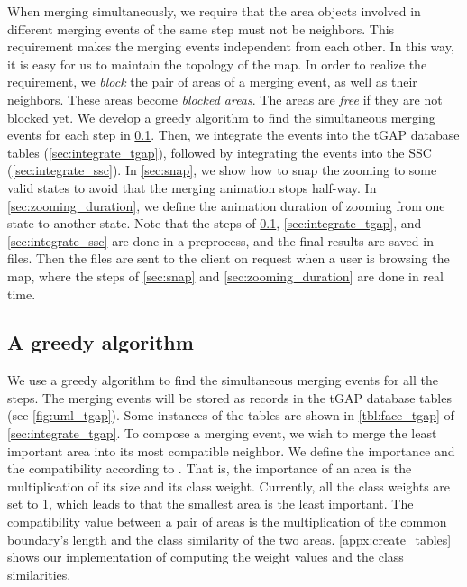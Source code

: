 \documentclass[twocolumn]{svjour3}          %
\begin{document}
When merging simultaneously,
we require that 
the area objects involved in different merging events of the same step 
must not be neighbors.
This requirement makes the merging events independent from each other.
In this way, it is easy for us to maintain the topology of the map.
In order to realize the requirement,
we \emph{block} the pair of areas of a merging event,
as well as their neighbors.
These areas become \emph{blocked areas}.
The areas are \emph{free} 
if they are not blocked yet.
We develop a greedy algorithm 
to find the simultaneous merging events for each step
in \sect\ref{sec:greedy_algo}.
Then, we integrate the events into the tGAP database tables
(\sect\ref{sec:integrate_tgap}),
followed by integrating the events into the SSC 
(\sect\ref{sec:integrate_ssc}).
In \sect\ref{sec:snap}, we show how to snap the zooming to some valid states
to avoid that the merging animation stops half-way.
In \sect\ref{sec:zooming_duration}, we define 
the animation duration of zooming from one state to another state.
Note that the steps of \sects\ref{sec:greedy_algo}, 
\ref{sec:integrate_tgap}, and \ref{sec:integrate_ssc}  
are done in a preprocess, and the final results are saved in files.
Then the files are sent to the client on request
when a user is browsing the map,
where the steps of \sects\ref{sec:snap} and \ref{sec:zooming_duration}
are done in real time.


\subsection{A greedy algorithm}
\label{sec:greedy_algo}

We use a greedy algorithm 
to find the simultaneous merging events for all the steps.
The merging events will be stored as records in the tGAP database tables
(see \fig\ref{fig:uml_tgap}).
Some instances of the tables are shown in 
\tabl\ref{tbl:face_tgap} of \sect\ref{sec:integrate_tgap}.
To compose a merging event, we wish to
merge the least important area into its most compatible neighbor.
We define the importance and the compatibility according to
\citet{vanPutten1998NewGAP}.
That is, the importance of an area is the multiplication 
of its size and its class weight.
Currently, all the class weights are set to 1,
which leads to that the smallest area is the least important.
The compatibility value between a pair of areas is 
the multiplication of the common boundary's length and 
the class similarity of the two areas.
\appx\ref{appx:create_tables} shows our implementation of
computing the weight values and the class similarities.
\end{document}
